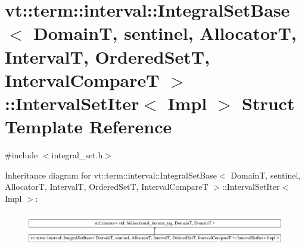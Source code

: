\hypertarget{structvt_1_1term_1_1interval_1_1_integral_set_base_1_1_interval_set_iter}{}\section{vt\+:\+:term\+:\+:interval\+:\+:Integral\+Set\+Base$<$ DomainT, sentinel, AllocatorT, IntervalT, Ordered\+SetT, Interval\+CompareT $>$\+:\+:Interval\+Set\+Iter$<$ Impl $>$ Struct Template Reference}
\label{structvt_1_1term_1_1interval_1_1_integral_set_base_1_1_interval_set_iter}


{\ttfamily \#include $<$integral\+\_\+set.\+h$>$}

Inheritance diagram for vt\+:\+:term\+:\+:interval\+:\+:Integral\+Set\+Base$<$ DomainT, sentinel, AllocatorT, IntervalT, Ordered\+SetT, Interval\+CompareT $>$\+:\+:Interval\+Set\+Iter$<$ Impl $>$\+:\begin{figure}[H]
\begin{center}
\leavevmode
\includegraphics[height=1.448900cm]{structvt_1_1term_1_1interval_1_1_integral_set_base_1_1_interval_set_iter}
\end{center}
\end{figure}
